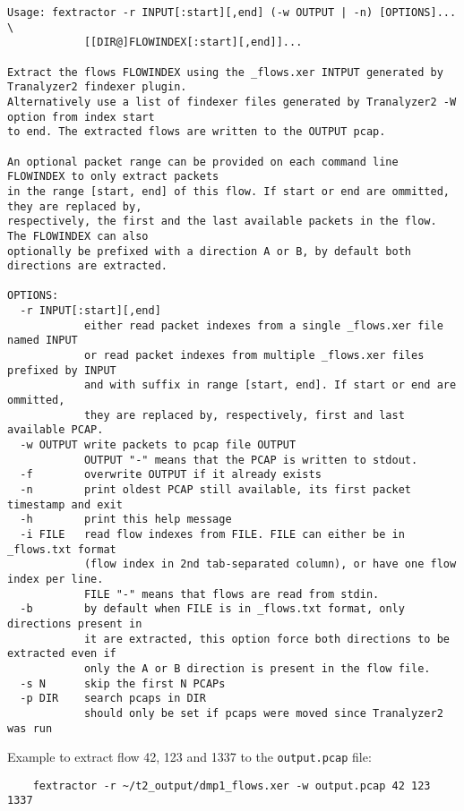 \documentclass[documentation]{subfiles}
\begin{document}
\begin{small}
\begin{verbatim}
Usage: fextractor -r INPUT[:start][,end] (-w OUTPUT | -n) [OPTIONS]... \
            [[DIR@]FLOWINDEX[:start][,end]]...

Extract the flows FLOWINDEX using the _flows.xer INTPUT generated by Tranalyzer2 findexer plugin.
Alternatively use a list of findexer files generated by Tranalyzer2 -W option from index start
to end. The extracted flows are written to the OUTPUT pcap.

An optional packet range can be provided on each command line FLOWINDEX to only extract packets
in the range [start, end] of this flow. If start or end are ommitted, they are replaced by,
respectively, the first and the last available packets in the flow. The FLOWINDEX can also
optionally be prefixed with a direction A or B, by default both directions are extracted.

OPTIONS:
  -r INPUT[:start][,end]
            either read packet indexes from a single _flows.xer file named INPUT
            or read packet indexes from multiple _flows.xer files prefixed by INPUT
            and with suffix in range [start, end]. If start or end are ommitted,
            they are replaced by, respectively, first and last available PCAP.
  -w OUTPUT write packets to pcap file OUTPUT
            OUTPUT "-" means that the PCAP is written to stdout.
  -f        overwrite OUTPUT if it already exists
  -n        print oldest PCAP still available, its first packet timestamp and exit
  -h        print this help message
  -i FILE   read flow indexes from FILE. FILE can either be in _flows.txt format
            (flow index in 2nd tab-separated column), or have one flow index per line.
            FILE "-" means that flows are read from stdin.
  -b        by default when FILE is in _flows.txt format, only directions present in
            it are extracted, this option force both directions to be extracted even if
            only the A or B direction is present in the flow file.
  -s N      skip the first N PCAPs
  -p DIR    search pcaps in DIR
            should only be set if pcaps were moved since Tranalyzer2 was run
\end{verbatim}
\end{small}

Example to extract flow 42, 123 and 1337 to the {\tt output.pcap} file:
    \begin{verbatim}
    fextractor -r ~/t2_output/dmp1_flows.xer -w output.pcap 42 123 1337
    \end{verbatim}
\end{document}
